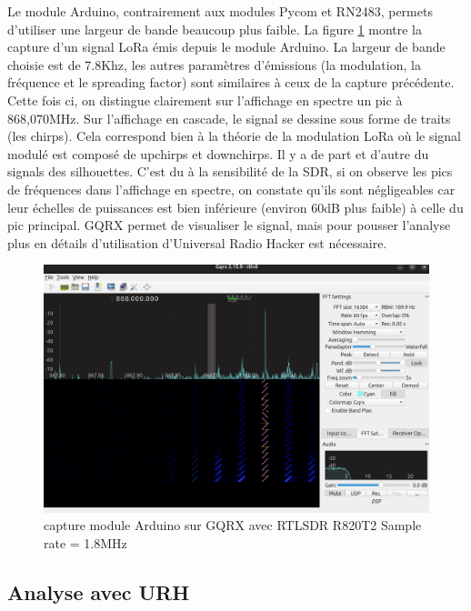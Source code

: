 Le module Arduino, contrairement aux modules Pycom et RN2483, permets d'utiliser une largeur de bande beaucoup plus faible. La figure \ref{term302} montre la capture d'un signal LoRa émis depuis le module Arduino. La largeur de bande choisie est de 7.8Khz, les autres paramètres d'émissions (la modulation, la fréquence et le spreading factor) sont similaires à ceux de la capture précédente. Cette fois ci, on distingue clairement sur l'affichage en spectre un pic à 868,070MHz. Sur l'affichage en cascade, le signal se dessine sous forme de traits (les chirps). Cela correspond bien à la théorie de la modulation LoRa où le signal modulé est composé de upchirps et downchirps. Il y a de part et d'autre du signals des silhouettes. C'est du à la sensibilité de la SDR, si on observe les pics de fréquences dans l'affichage en spectre, on constate qu'ils sont négligeables car leur échelles de puissances est bien inférieure (environ 60dB plus faible) à celle du pic principal. GQRX permet de visualiser le signal, mais pour pousser l'analyse plus en détails d'utilisation d'Universal Radio Hacker est nécessaire.

\begin{figure}[h]
\centering

\includegraphics[scale=0.17]{images/gqrx5.png}
\caption{capture module Arduino sur GQRX avec RTLSDR R820T2 Sample rate = 1.8MHz}\label{term302}
\end{figure}


\subsection{Analyse avec URH}\label{urh}

